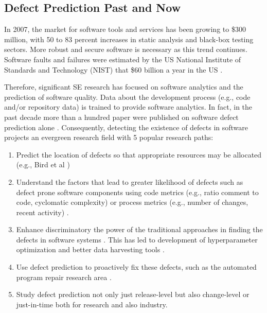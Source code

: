 \documentclass[10pt,conference]{IEEEtran}
\begin{document}
\begin{table}[!t]
{\begin{tabular}{l|l|l|p{10cm}|}
\end{tabular}}
\vspace{-7pt}
\end{table}

\subsection{Defect Prediction Past and Now}

In 2007, the market for software tools and services has been growing to \$300 million, with 50 to 83 percent increases in static analysis and black-box testing sectors. More robust and secure software is necessary as this trend continues. Software faults and
failures were estimated by the US National Institute of
Standards and Technology (NIST) that  \$60 billion a year in the US \cite{softwareecon}. 

Therefore, significant SE research has focused on software analytics and the prediction of software quality. Data about the development process (e.g., code and/or repository data) is trained to provide software analytics. In fact, in the past decade more than a hundred paper were published on software defect prediction alone \cite{sedp100}. Consequently, detecting the existence of defects in software projects an evergreen research field with 5 popular research paths:
\begin{enumerate}
    \item Predict the location of defects so that appropriate resources may be allocated (e.g., Bird et al \cite{bird09reliabity})
    \item Understand the factors that lead to greater likelihood of defects such as defect prone software components using code metrics (e.g., ratio comment to code, cyclomatic complexity) \cite{menzies10dp, menzies07dp, ambros10extensive} or process metrics (e.g., number of changes, recent activity) \cite{nagappan05codechurn,elbaum00codechurn, moser08changemetrics, hassan09codechanges}.
    \item Enhance discriminatory the power of the traditional approaches in finding the defects in software systems \cite{ghotra15}. This has led to development of hyperparameter optimization and better data harvesting tools \cite{agrawal2018wrong, agrawal2018better, Fu17easy, Fu16Grid, Fu2016TuningFS}. 
    \item Use defect prediction to proactively fix these defects, such as the automated program repair research area \cite{kamei16_lit, legoues12_aprlit, arcuri2011practical}. 
    \item Study defect prediction not only just release-level \cite{di18_fft, agrawal2018better} but also change-level or just-in-time \cite{yan18_tddetermination, kamei12_jit, nayrolles18_clever, commitguru} both for research and also industry.  
\end{enumerate}
\end{document}
